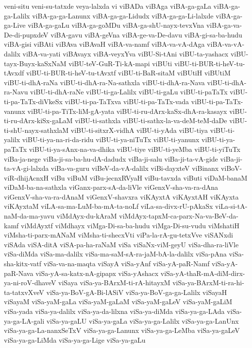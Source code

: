 {veni-situ
veni-su-tatxde
veya-lalxda
vi
viBADa
viBAga
viBA-ga-gaLa
viBA-ga-ga-Lalilx
viBA-ga-ga-Lanunx
viBA-ga-ga-Lidudx
viBA-ga-ga-Li-lalxde
viBA-ga-ga-Live
viBA-ga-gaLu
viBA-ga-goMDu
viBA-ga-shU-nayx-tevxVna
viBA-ga-va-De-di-pupxdeV
viBA-gavu
viBA-geVna
viBA-ge-va-De-davu
viBA-gi-sa-ba-hudu
viBA-gisi
viBAti
viBAva
viBAvaH
viBA-va-namf
viBA-va-vA-dAga
viBA-va-vA-dalilx
viBA-va-yati
viBAvayx
viBA-veyxYva
viBU-Si-tAni
viBU-ta-yashacx
viBU-tayx-Buyx-kaSxNaM
viBU-teV-GuR-Ti-kA-mapi
viBUti
viBU-ti-BUR-ti-heV-tu-tAvxdf
viBU-ti-BUR-ti-heV-tu-tAvxtf
viBU-ti-BaR-sitaM
viBUtiH
viBUtiM
viBU-ti-dhA-raNa
viBU-ti-dhA-ra-Na-sathxla
viBU-ti-dhA-ra-Nava
viBU-ti-dhA-ra-Navu
viBU-ti-dhA-raNe
viBU-ti-ga-Lalilx
viBU-ti-gaLu
viBU-ti-paTaTx
viBU-ti-pa-TaTx-diVkeSx
viBU-ti-pa-TaTxva
viBU-ti-pa-TaTx-vada
viBU-ti-pa-TaTx-vanunx
viBU-ti-pa-TiTx-liM-gA-yata
viBU-ti-ru-dArx-kaSx-dhA-ra-kasayx
viBU-ti-ru-dArx-kiSx-gaLaM
viBU-ti-sathxla
viBU-ti-sathx-la-va-deM-teM-daDe
viBU-ti-shU-nayx-sathxlaM
viBU-ti-sitxrX-vidhA
viBU-ti-yAda
viBU-tiya
viBU-ti-yalilx
viBU-ti-ya-na-ri-da-ridu
viBU-ti-ya-niTuTx
viBU-ti-yanunx
viBU-ti-ya-paTaTx
viBU-ti-ya-sAnx-na-va-dhika
viBU-tiye
viBU-ti-yeMba
viBU-ti-yiTuTx
viBa-ja-nege
viBa-ji-sa-ba-hu-dA-dadudx
viBa-ji-salu
viBa-ji-ta-vA-gide
viBa-ji-ta-vA-gi-lalxda
viBa-va-guru
viBeV-da-vA-dalilx
viBi-dayxteV
viBinanx
viBoV-viR-dhijAcnxH
viBu
viBuM
viBu-jecnxRVyaH
viBu-tavxda
viButi
viDaM-banaM
viDaM-ba-na-sathxla
viGanx-parx-sA-da-liVle
viGenxV-sha-va-ra-dAna
viGenxV-sha-va-ra-dAnaM
viGenxV-shavxra
viKAyxtA
viKAyxtAH
viKAyxta
viKAyxtaM
viLA-sa-ma-LuM-ba-mA-ta-noLf
viLa-sa-divx-rU-pAkaSx
viLa-si-tA-naM-da-ma-yavu
viMdAyx-du-kAraM
viMdAyx-tapxM-ca-parx-Na-va-BeV-da-kamf
viMdAyxtf
viMdhayx
viMga-Di-sa-ba-hudu
viMga-Di-su-vudu
viMshatiH
viMsha-ti-parx-mANaM
viMsha-ti-shecxVti
viPa-la-rA-gu-tetxVve
viSANxdi
viSAda
viSA-ditA
viSA-pa-ha-raNaM
viSa
viSaNx-viM-geyU
viSa-dha-ra-liVle
viSa-diMda
viSa-ma-dalilx
viSa-ma-saM-sA-ra-jaM-bA-la-dalilx
viSa-pAna
viSa-sha-kitx-vatf
viSa-va-na-maqta
viSayA
viSa-yAnf
viSa-yA-paR-Namf
viSa-yA-paR-Nava
viSa-yA-sa-katx-nA-gipapx
viSa-yAshacx
viSa-yA-thaR-mA-diM-dirx-ya-ni-roV-dhaveV
viSaya
viSa-ya-BArxM-ti-rA-hitayxM
viSa-ya-BArxM-ti-ra-hi-ta-tatxvXveV
viSa-ya-BoV-gA-Bi-lASiV
viSa-ya-BoV-ga-ga-Lalilx
viSayaH
viSayaM
viSa-yaM-gaLa
viSa-yaM-gaLaM
viSa-yaM-gaLeV
viSa-yaM-gaLiM
viSa-yada
viSa-ya-dalilx
viSa-ya-da-lilxna
viSa-ya-diMda
viSa-ya-ga-LAda
viSa-ya-ga-LA-gali
viSa-ya-gaLU
viSa-ya-gaLa
viSa-ya-ga-Lalilx
viSa-ya-ga-LanUnx
viSa-ya-ga-La-nanxSeTxV
viSa-ya-ga-Lanunx
viSa-ya-ga-LeMba
viSa-ya-gaLeV
viSa-ya-ga-LiMda
viSa-ya-ga-Lige
viSa-ya-gaLu
}
